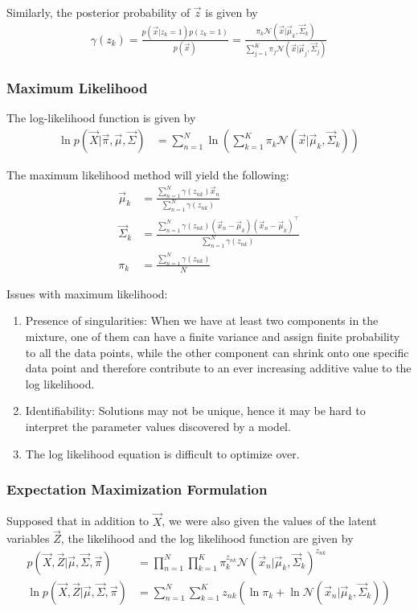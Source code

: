 \documentclass[12pt,twoside]{article}
\begin{document}
Similarly, the posterior probability of $\vec{z}$ is given by
\begin{align*}
	\gamma (z_k) = \frac{p(\vec{x}\vert z_k=1)p(z_k=1)}{p(\vec{x})} = \frac{\pi_k \mathcal{N}(\vec{x}\vert \vec{\mu}_k, \vec{\Sigma}_k) }{\sum_{j=1}^K \pi_j\mathcal{N}(\vec{x}\vert \vec{\mu}_j, \vec{\Sigma}_j)}
\end{align*}

\subsubsection{Maximum Likelihood}
The log-likelihood function is given by
\begin{align*}
	\ln p(\vec{X} \vert \vec{\pi}, \vec{\mu}, \vec{\Sigma})&=\sum_{n=1}^N \ln\left(\sum_{k=1}^K \pi_k\mathcal{N}(\vec{x}\vert \vec{\mu}_k, 	\vec{\Sigma}_k)\right)
\end{align*}

The maximum likelihood method will yield the following:
\begin{align*}
	\vec{\mu}_k & = \frac{\sum_{n=1}^N \gamma(z_{nk})\vec{x}_n}{\sum_{n=1}^N \gamma(z_{nk})}\\
	\vec{\Sigma}_k& = \frac{\sum_{n=1}^N \gamma(z_{nk})(\vec{x}_n-\vec{\mu}_k)(\vec{x}_n-\vec{\mu}_k)^\top}{\sum_{n=1}^N \gamma(z_{nk})}\\
	\pi_k&= \frac{\sum_{n=1}^N \gamma(z_{nk})}{N}
\end{align*}

Issues with maximum likelihood:
\begin{enumerate}
	\item Presence of singularities: When we have at least two components in the mixture, one of them can have a finite variance and assign finite probability to all the data points, while the other component can shrink onto one specific data point and therefore contribute to an ever increasing additive value to the log likelihood.
	\item Identifiability: Solutions may not be unique, hence it may be hard to interpret the parameter values discovered by a model.
	\item The log likelihood equation is difficult to optimize over.
\end{enumerate}


\subsubsection{Expectation Maximization Formulation}
Supposed that in addition to $\vec{X}$, we were also given the values of the latent variables $\vec{Z}$, the likelihood and the log likelihood function are given by
\begin{align*}
	p(\vec{X}, \vec{Z}\vert \vec{\mu}, \vec{\Sigma}, \vec{\pi})& =\prod_{n=1}^{N}\prod_{k=1}^{K} \pi_k^{z_{nk}}\mathcal{N}(\vec{x}_n\vert \vec{\mu}_k, \vec{\Sigma}_k)^{z_{nk}}\\
	\ln p(\vec{X}, \vec{Z}\vert \vec{\mu}, \vec{\Sigma}, \vec{\pi})& =\sum_{n=1}^{N}\sum_{k=1}^{K} z_{nk}\left(\ln \pi_k + \ln \mathcal{N}(\vec{x}_n\vert \vec{\mu}_k, \vec{\Sigma}_k)\right)
\end{align*}
\end{document}
